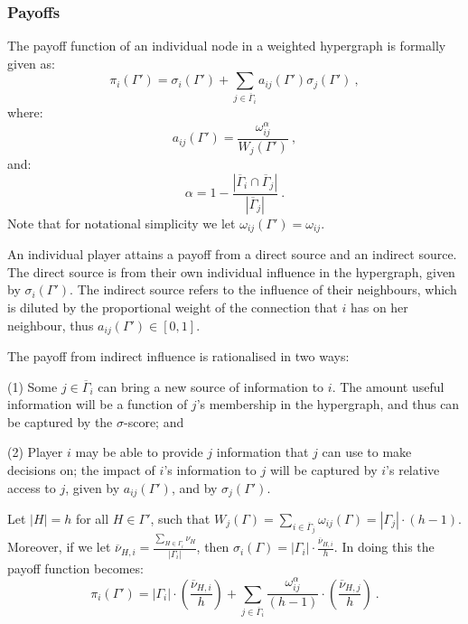 \begin{subappendices}
\subsubsection*{Payoffs}

The payoff function of an individual node in a weighted hypergraph is formally given as:
\begin{equation} \label{payoff1}
\pi_{i}(\Gamma') = \sigma_{i}(\Gamma') + \sum_{j \in \overline{\Gamma}_{i}} a_{ij}(\Gamma') \sigma_{j}(\Gamma') ~ ,
\end{equation}
where:
\begin{equation}
a_{ij}(\Gamma') = \frac{\omega_{ij}^{\alpha}}{W_{j}(\Gamma')} ~ ,
\end{equation}
and:
\begin{equation}
\alpha = 1 - \frac{| \overline{\Gamma}_{i} \cap \overline{\Gamma}_{j} |}{| \overline{\Gamma}_{j} |} ~ .
\end{equation}
Note that for notational simplicity we let $\omega_{ij}(\Gamma') = \omega_{ij}$.

An individual player attains a payoff from a direct source and an indirect source. The direct source is from their own individual influence in the hypergraph, given by $\sigma_{i}(\Gamma')$. The indirect source refers to the influence of their neighbours, which is diluted by the proportional weight of the connection that $i$ has on her neighbour, thus $a_{ij}(\Gamma') \in [0,1]$.

The payoff from indirect influence is rationalised in two ways:
\begin{abet}
\item[(1)] Some $j \in \overline{\Gamma}_{i}$ can bring a new source of information to $i$. The amount useful information will be a function of $j$'s membership in the hypergraph, and thus can be captured by the $\sigma$-score; and

\item[(2)] Player $i$ may be able to provide $j$ information that $j$ can use to make decisions on; the impact of $i$'s information to $j$ will be captured by $i$'s relative access to $j$, given by $a_{ij}(\Gamma')$, and by $\sigma_{j}(\Gamma')$.
\end{abet}

Let $|H| = h$ for all $H \in \Gamma'$, such that $W_{j}(\Gamma) = \sum_{i \in \overline{\Gamma}_{j}} \omega_{ij} (\Gamma) = |\Gamma_{j}| \cdot (h-1)$. Moreover, if we let $\overline{\nu}_{H,i} = \frac{\sum_{H \in \Gamma_{i}} \nu_{H}}{| \Gamma_{i} |}$, then $\sigma_{i}(\Gamma) = |\Gamma_{i}| \cdot \frac{\overline{\nu}_{H,i}}{h}$. In doing this the payoff function becomes:
\begin{equation} \label{payoff2}
\pi_{i}(\Gamma') = | \Gamma_{i} | \cdot \left( \frac{\overline{\nu}_{H,i}}{h} \right) + \sum_{j \in \overline{\Gamma}_{i}} \frac{\omega_{ij}^{\alpha}}{(h-1)} \cdot \left( \frac{\overline{\nu}_{H,j}}{h} \right) ~ .
\end{equation}


\end{subappendices}
